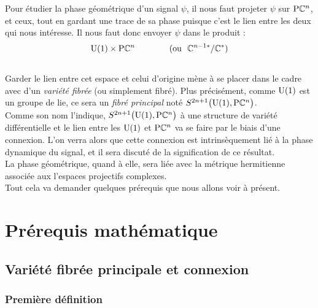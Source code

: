  Pour étudier la phase géométrique d'un signal $\psi$, il nous faut projeter $\psi$ sur $\text{\normalfont P}\mathbb{C}^{n}$, et ceux, tout en gardant une trace de sa phase puisque c'est le lien entre les deux qui nous intéresse. Il nous faut donc envoyer $\psi$ dans le produit :
\[\text{\normalfont U}(1)\times \text{\normalfont P}\mathbb{C}^{n}\qquad\qquad (\text{ou }\ \mathbb{C}^{n-1*}/\mathbb{C}^*)\]
\\
Garder le lien entre cet espace et celui d'origine mène à se placer dans le cadre avec d'un \emph{variété fibrée} (ou simplement fibré). Plus précisément, comme $\text{\normalfont U}(1)$ est un groupe de lie, ce sera un \emph{fibré principal} noté $S^{2n+1}\big(\text{\normalfont U}(1),\text{\normalfont P}\mathbb{C}^{n}\big)$.
\\

Comme son nom l'indique, $S^{2n+1}\big(\text{\normalfont U}(1),\text{\normalfont P}\mathbb{C}^{n}\big)$ à une structure de variété différentielle et le lien entre les $\text{\normalfont U}(1)$ et $\text{\normalfont P}\mathbb{C}^{n}$ va se faire par le biais d'une connexion. L'on verra alors que cette connexion est intrinsèquement lié à la phase dynamique du signal, et il sera discuté de la signification de ce résultat.
\\
La phase géométrique, quand à elle, sera liée avec la métrique hermitienne associée aux l'espaces projectifs complexes.
\\
Tout cela va demander quelques prérequis que nous allons voir à présent.
\\



\section{Prérequis mathématique}

\subsection{Variété fibrée principale et connexion} \label{subsec:VFP}

\subsubsection{Première définition}


